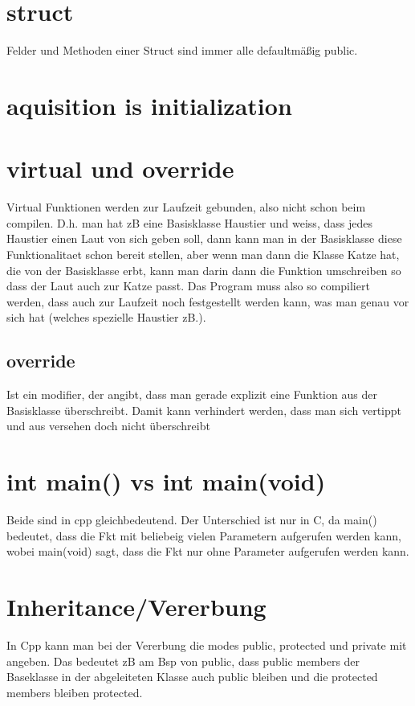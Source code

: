 \documentclass[paper=a4,10pt]{scrartcl}
\begin{document}
\section{struct}
Felder und Methoden einer Struct sind immer alle defaultmäßig public.

\section{aquisition is initialization}

\section{virtual und override}
Virtual Funktionen werden zur Laufzeit gebunden, also nicht schon beim compilen. D.h. man hat zB eine Basisklasse Haustier und weiss, dass jedes Haustier einen Laut von sich geben soll, dann kann man in der Basisklasse diese Funktionalitaet schon bereit stellen, aber wenn man dann die Klasse Katze hat, die von der Basisklasse erbt, kann man darin dann die Funktion umschreiben so dass der Laut auch zur Katze passt.
Das Program muss also so compiliert werden, dass auch zur Laufzeit noch festgestellt werden kann, was man genau vor sich hat (welches spezielle Haustier zB.).

\subsection{override}
Ist ein modifier, der angibt, dass man gerade explizit eine Funktion aus der Basisklasse überschreibt. Damit kann verhindert werden, dass man sich vertippt und aus versehen doch nicht überschreibt

\section{int main() vs int main(void)}
Beide sind in cpp gleichbedeutend. Der Unterschied ist nur in C, da main() bedeutet, dass die Fkt mit beliebeig vielen Parametern aufgerufen werden kann, wobei main(void) sagt, dass die Fkt nur ohne Parameter aufgerufen werden kann.

\section{Inheritance/Vererbung}
In Cpp kann man bei der Vererbung die modes public, protected und private mit angeben. Das bedeutet zB am Bsp von public, dass public members der Baseklasse in der abgeleiteten Klasse auch public bleiben und die protected members bleiben protected.
\end{document}

